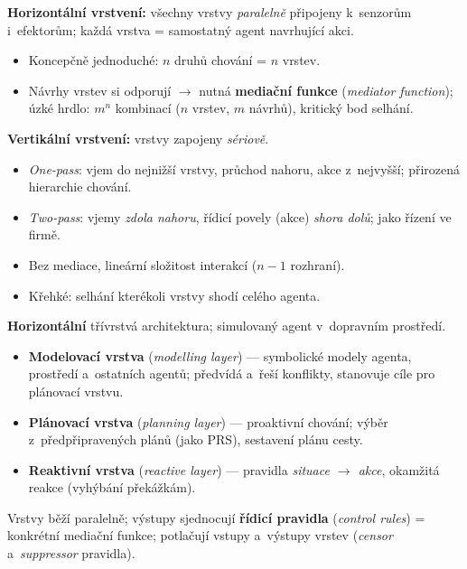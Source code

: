 \documentclass[11pt,a4paper]{article}
\theoremstyle{definition}
\begin{document}
\begin{defbox}
\textbf{Horizontální vrstvení:} všechny vrstvy \emph{paralelně} připojeny k~senzorům
i~efektorům; každá vrstva = samostatný agent navrhující akci.
\begin{itemize}
\item[$+$] Koncepčně jednoduché: $n$ druhů chování = $n$ vrstev.
\item[$-$] Návrhy vrstev si odporují $\to$ nutná \textbf{mediační funkce} (\emph{mediator
  function}); úzké hrdlo: $m^n$ kombinací ($n$ vrstev, $m$ návrhů), kritický bod selhání.
\end{itemize}

\textbf{Vertikální vrstvení:} vrstvy zapojeny \emph{sériově}.
\begin{itemize}
\item \emph{One-pass}: vjem do nejnižší vrstvy, průchod nahoru, akce z~nejvyšší; přirozená
  hierarchie chování.
\item \emph{Two-pass}: vjemy \emph{zdola nahoru}, řídicí povely (akce) \emph{shora dolů};
  jako řízení ve firmě.
\item[$+$] Bez mediace, lineární složitost interakcí ($n-1$ rozhraní).
\item[$-$] Křehké: selhání kterékoli vrstvy shodí celého agenta.
\end{itemize}
\end{defbox}

\begin{defbox}
\textbf{Horizontální} třívrstvá architektura; simulovaný agent v~dopravním prostředí.
\begin{itemize}
\item \textbf{Modelovací vrstva} (\emph{modelling layer}) --- symbolické modely agenta,
  prostředí a~ostatních agentů; předvídá a~řeší konflikty, stanovuje cíle pro plánovací vrstvu.
\item \textbf{Plánovací vrstva} (\emph{planning layer}) --- proaktivní chování; výběr
  z~předpřipravených plánů (jako PRS), sestavení plánu cesty.
\item \textbf{Reaktivní vrstva} (\emph{reactive layer}) --- pravidla \emph{situace $\to$ akce},
  okamžitá reakce (vyhýbání překážkám).
\end{itemize}
Vrstvy běží paralelně; výstupy sjednocují \textbf{řídicí pravidla} (\emph{control rules})
= konkrétní mediační funkce; potlačují vstupy a~výstupy vrstev (\emph{censor}
a~\emph{suppressor} pravidla).
\end{defbox}
\end{document}
